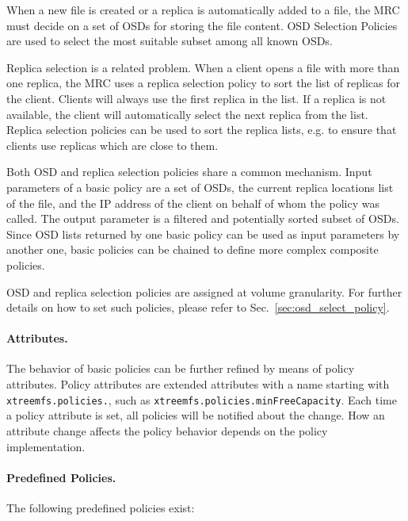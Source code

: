 \documentclass[a4paper,10pt]{book}
\begin{document}
When a new file is created or a replica is automatically added to a file, the MRC must decide on a set of OSDs for storing the file content. OSD Selection Policies are used to select the most suitable subset among all known OSDs.

Replica selection is a related problem. When a client opens a file with more than one replica, the MRC uses a replica selection policy to sort the list of replicas for the client. Clients will always use the first replica in the list. If a replica is not available, the client will automatically select the next replica from the list. Replica selection policies can be used to sort the replica lists, e.g. to ensure that clients use replicas which are close to them.

Both OSD and replica selection policies share a common mechanism. Input parameters of a basic policy are a set of OSDs, the current replica locations list of the file, and the IP address of the client on behalf of whom the policy was called. The output parameter is a filtered and potentially sorted subset of OSDs. Since OSD lists returned by one basic policy can be used as input parameters by another one, basic policies can be chained to define more complex composite policies.

OSD and replica selection policies are assigned at volume granularity. For further details on how to set such policies, please refer to Sec.\ \ref{sec:osd_select_policy}.

\paragraph{Attributes.}

The behavior of basic policies can be further refined by means of policy attributes. Policy attributes are extended attributes with a name starting with \texttt{xtreemfs.policies.}, such as \texttt{xtreemfs.policies.minFreeCapacity}. Each time a policy attribute is set, all policies will be notified about the change. How an attribute change affects the policy behavior depends on the policy implementation.

\paragraph{Predefined Policies.}

The following predefined policies exist:
\end{document}
